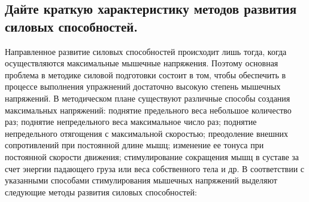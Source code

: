 \subsection{Дайте краткую характеристику методов развития силовых способностей.}

Направленное развитие силовых способностей происходит лишь тогда, когда осуществляются максимальные мышечные напряжения. Поэтому основная проблема в методике силовой подготовки состоит в том, чтобы обеспечить в процессе выполнения упражнений достаточно высокую степень мышечных напряжений. В методическом плане существуют различные способы создания максимальных напряжений: поднятие предельного веса небольшое количество раз; поднятие непредельного веса максимальное число раз; поднятие непредельного отягощения с максимальной скоростью; преодоление внешних сопротивлений при постоянной длине мышц; изменение ее тонуса при постоянной скорости движения; стимулирование сокращения мышц в суставе за счет энергии падающего груза или веса собственного тела и др. В соответствии с указанными способами стимулирования мышечных напряжений выделяют следующие методы развития силовых способностей:
